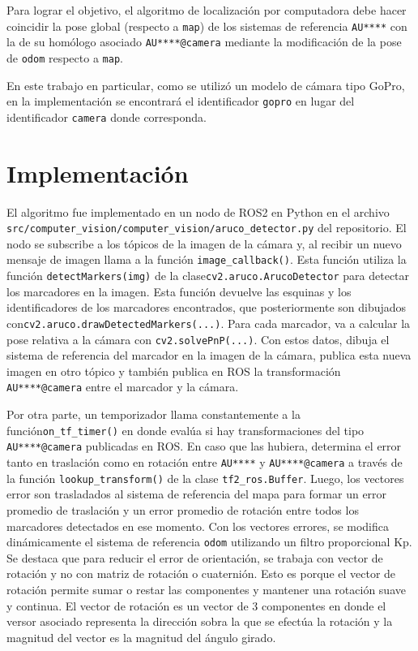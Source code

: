 \documentclass[12pt, a4paper]{report}
\begin{document}
				Para lograr el objetivo, el algoritmo de localización por computadora debe hacer coincidir la pose global (respecto a \texttt{map}) de los sistemas de referencia \texttt{AU****} con la de su homólogo asociado \texttt{AU****@camera} mediante la modificación de la pose de \texttt{odom} respecto a \texttt{map}.

				En este trabajo en particular, como se utilizó un modelo de cámara tipo GoPro, en la implementación se encontrará el identificador \texttt{gopro} en lugar del identificador \texttt{camera} donde corresponda.
			\section{Implementación}\label{sec:algoritmo-localizacion/implementacion}
				El algoritmo fue implementado en un nodo de ROS2 en Python en el archivo \texttt{src/computer\_vision/computer\_vision/aruco\_detector.py} del repositorio.
				El nodo se subscribe a los tópicos de la imagen de la cámara y, al recibir un nuevo mensaje de imagen llama a la función \texttt{image\_callback()}.
				Esta función utiliza la función \texttt{detectMarkers(img)} de la clase\linebreak\texttt{cv2.aruco.ArucoDetector} para detectar los marcadores en la imagen.
				Esta función devuelve las esquinas y los identificadores de los marcadores encontrados, que posteriormente son dibujados con\linebreak\texttt{cv2.aruco.drawDetectedMarkers(...)}.
				Para cada marcador, va a calcular la pose relativa a la cámara con \texttt{cv2.solvePnP(...)}.
				Con estos datos, dibuja el sistema de referencia del marcador en la imagen de la cámara, publica esta nueva imagen en otro tópico y también publica en ROS la transformación \texttt{AU****@camera} entre el marcador y la cámara.

				Por otra parte, un temporizador llama constantemente a la función\linebreak\texttt{on\_tf\_timer()} en donde evalúa si hay transformaciones del tipo \linebreak\texttt{AU****@camera} publicadas en ROS\@.
				En caso que las hubiera, determina el error tanto en traslación como en rotación entre \texttt{AU****} y \texttt{AU****@camera} a través de la función \texttt{lookup\_transform()} de la clase \texttt{tf2\_ros.Buffer}.
				Luego, los vectores error son trasladados al sistema de referencia del mapa para formar un error promedio de traslación y un error promedio de rotación entre todos los marcadores detectados en ese momento.
				Con los vectores errores, se modifica dinámicamente el sistema de referencia \texttt{odom} utilizando un filtro proporcional Kp.
				Se destaca que para reducir el error de orientación, se trabaja con vector de rotación y no con matriz de rotación o cuaternión.
				Esto es porque el vector de rotación  permite sumar o restar las componentes y mantener una rotación suave y continua.
				El vector de rotación es un vector de 3 componentes en donde el versor asociado representa la dirección sobra la que se efectúa la rotación y la magnitud del vector es la magnitud del ángulo girado.
\end{document}

